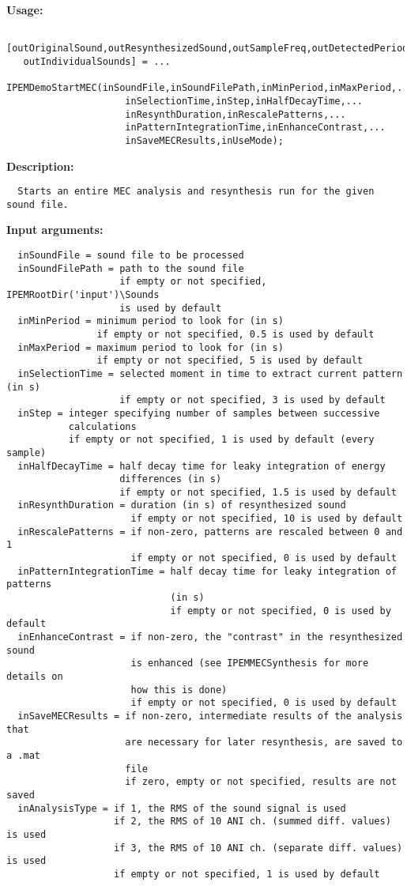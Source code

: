 \textbf{Usage:}
\begin{verbatim}  [outOriginalSound,outResynthesizedSound,outSampleFreq,outDetectedPeriods,...
   outIndividualSounds] = ...
    IPEMDemoStartMEC(inSoundFile,inSoundFilePath,inMinPeriod,inMaxPeriod,...
                     inSelectionTime,inStep,inHalfDecayTime,...
                     inResynthDuration,inRescalePatterns,...
                     inPatternIntegrationTime,inEnhanceContrast,...
                     inSaveMECResults,inUseMode);

\end{verbatim}
\textbf{Description:}
\begin{verbatim}  Starts an entire MEC analysis and resynthesis run for the given sound file.

\end{verbatim}
\textbf{Input arguments:}
\begin{verbatim}  inSoundFile = sound file to be processed
  inSoundFilePath = path to the sound file
                    if empty or not specified, IPEMRootDir('input')\Sounds
                    is used by default
  inMinPeriod = minimum period to look for (in s)
                if empty or not specified, 0.5 is used by default
  inMaxPeriod = maximum period to look for (in s)
                if empty or not specified, 5 is used by default
  inSelectionTime = selected moment in time to extract current pattern (in s)
                    if empty or not specified, 3 is used by default
  inStep = integer specifying number of samples between successive
           calculations
           if empty or not specified, 1 is used by default (every sample)
  inHalfDecayTime = half decay time for leaky integration of energy
                    differences (in s)
                    if empty or not specified, 1.5 is used by default
  inResynthDuration = duration (in s) of resynthesized sound
                      if empty or not specified, 10 is used by default
  inRescalePatterns = if non-zero, patterns are rescaled between 0 and 1
                      if empty or not specified, 0 is used by default
  inPatternIntegrationTime = half decay time for leaky integration of patterns
                             (in s)
                             if empty or not specified, 0 is used by default
  inEnhanceContrast = if non-zero, the "contrast" in the resynthesized sound
                      is enhanced (see IPEMMECSynthesis for more details on
                      how this is done)
                      if empty or not specified, 0 is used by default
  inSaveMECResults = if non-zero, intermediate results of the analysis that
                     are necessary for later resynthesis, are saved to a .mat
                     file
                     if zero, empty or not specified, results are not saved
  inAnalysisType = if 1, the RMS of the sound signal is used
                   if 2, the RMS of 10 ANI ch. (summed diff. values) is used
                   if 3, the RMS of 10 ANI ch. (separate diff. values) is used
                   if empty or not specified, 1 is used by default

\end{verbatim}
